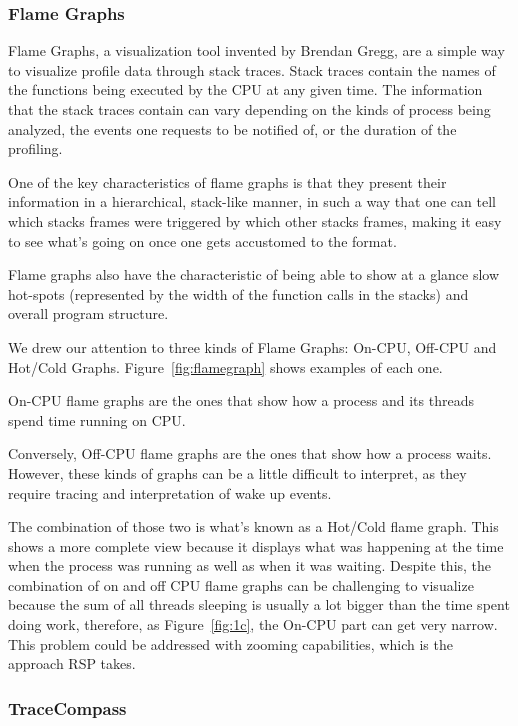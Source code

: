 \documentclass[10pt]{article}
\begin{document}
\subsubsection{Flame Graphs}

Flame Graphs, a visualization tool invented by Brendan
Gregg\cite{brendanGregg}, are a simple way to visualize profile data through
stack traces. Stack traces contain the names of the functions being executed by
the CPU at any given time. The information that the stack traces contain can
vary depending on the kinds of process being analyzed, the events one requests
to be notified of, or the duration of the profiling.

One of the key characteristics of flame graphs is that they present their
information in a hierarchical, stack-like manner, in such a way that one can
tell which stacks frames were triggered by which other stacks frames,
making it easy to see what's going on once one gets accustomed to the format.

Flame graphs also have the characteristic of being able to show at a glance
slow hot-spots (represented by the width of the function calls in the
stacks) and overall program structure.

We drew our attention to three kinds of Flame Graphs: On-CPU\cite{oncpu},
Off-CPU\cite{offcpu} and Hot/Cold Graphs\cite{hotcold}.
Figure~\ref{fig:flamegraph} shows examples of each one.

On-CPU flame graphs are the ones that show how a process and its threads spend
time running on CPU.

Conversely, Off-CPU flame graphs are the ones that show how a process waits.
However, these kinds of graphs can be a little difficult to interpret, as they
require tracing and interpretation of wake up events.

The combination of those two is what's known as a Hot/Cold flame graph. This
shows a more complete view because it displays what was happening at the time
when the process was running as well as when it was waiting. Despite this, the
combination of on and off CPU flame graphs can be challenging to visualize because
the sum of all threads sleeping is usually a lot bigger than the time spent
doing work, therefore, as Figure~\ref{fig:1c}, the On-CPU part can get very
narrow. This problem could be addressed with zooming capabilities, which
is the approach RSP takes.

\subsubsection{TraceCompass}
\end{document}
